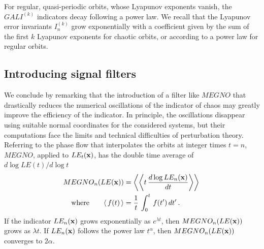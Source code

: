 For regular, quasi-periodic  orbits,  whose Lyapunov exponents vanish, the $GALI^{(k)}$ indicators decay following a power law. We recall that the Lyapunov error invariants $I_n^{(k)}$ grow exponentially with a coefficient given by the sum of the first $k$ Lyapunov exponents for chaotic orbits, or according to a power law for regular orbits. %
\subsection{Introducing signal filters}
%
We conclude by remarking that the introduction of a filter like $MEGNO$ that drastically reduces the numerical oscillations of the indicator of chaos may greatly improve the efficiency of the indicator. In principle, the oscillations disappear using suitable normal coordinates for the considered systems, but their computations face the limits and technical difficulties of perturbation theory. Referring to the phase flow that interpolates the orbits at integer times $t=n$, $MEGNO$, applied to $LE_t(\vb{x})$, has the double time average of $d\log LE(t)/d\log t$  %
%
\begin{equation}
\begin{split}
    MEGNO_n(LE(\vb{x})) & =  %
   \left\langle\left\langle  t\, \frac{d\log LE_n(\vb{x})}{ dt}\right \rangle \right \rangle\, \\
 \text{where} \qquad \mean{f(t)}& = \frac{1}{ t}\,\int_0^t \,f(t')\,dt' \, .
\end{split}
\label{eq3-23}
\end{equation}
%
If the indicator $LE_n(\vb{x})$ grows exponentially as $e^{\lambda t}$, then $MEGNO_n(LE(\vb{x}))$ grows as $\lambda t$. If $LE_n(\vb{x})$ follows the power law $t^\alpha$, then $MEGNO_n(LE(\vb{x}))$ converges to $2\alpha$.%

